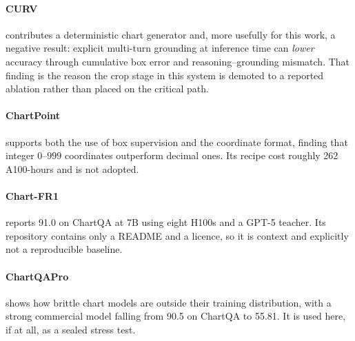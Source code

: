 \paragraph{CURV} contributes a deterministic chart generator and, more usefully for this work, a
negative result: explicit multi-turn grounding at inference time can \emph{lower} accuracy through
cumulative box error and reasoning--grounding mismatch. That finding is the reason the crop stage in
this system is demoted to a reported ablation rather than placed on the critical path.

\paragraph{ChartPoint} supports both the use of box supervision and the coordinate format, finding
that integer $0$--$999$ coordinates outperform decimal ones. Its recipe cost roughly 262 A100-hours
and is not adopted.

\paragraph{Chart-FR1} reports 91.0 on ChartQA at 7B using eight H100s and a GPT-5 teacher. Its
repository contains only a README and a licence, so it is context and explicitly not a reproducible
baseline.

\paragraph{ChartQAPro} shows how brittle chart models are outside their training distribution, with
a strong commercial model falling from 90.5 on ChartQA to 55.81. It is used here, if at all, as a
sealed stress test.
